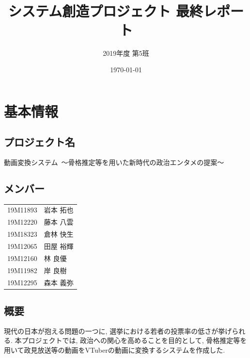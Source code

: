 \documentclass[a4paper,12pt]{jsarticle}
\title{システム創造プロジェクト 最終レポート}
\author{2019年度 第5班}
\date{\today}
\begin{document}
\maketitle

\section{基本情報}
\subsection{プロジェクト名}
{\large 動画変換システム\ 〜骨格推定等を用いた新時代の政治エンタメの提案〜}

\subsection{メンバー}
\begin{table}[H]
    \begin{tabular}{cl}
        19M11893 & 岩本 拓也\\
        19M12220 & 藤本 八雲\\
        19M18323 & 倉林 快生\\
        19M12065 & 田屋 裕輝\\
        19M12160 & 林 良優\\
        19M11982 & 岸 良樹\\
        19M12295 & 森本 義弥
	\end{tabular}
\end{table}

\subsection{概要}

現代の日本が抱える問題の一つに, 選挙における若者の投票率の低さが挙げられる.
本プロジェクトでは, 政治への関心を高めることを目的として, 骨格推定等を用いて政見放送等の動画をVTuberの動画に変換するシステムを作成した.
\end{document}
